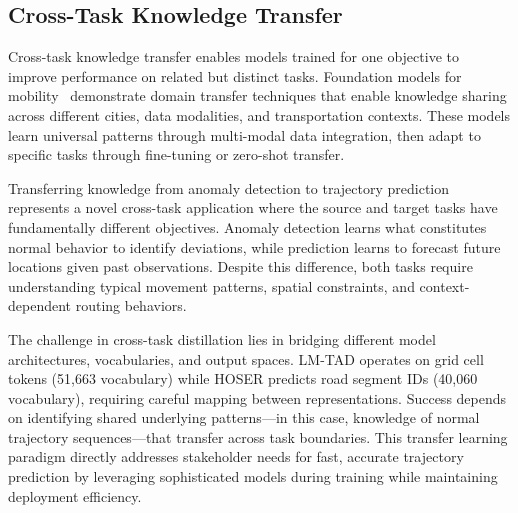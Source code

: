 \subsection{Cross-Task Knowledge Transfer}
\label{sec:lit-transfer}

Cross-task knowledge transfer enables models trained for one objective to improve performance on related but distinct tasks. Foundation models for mobility~\cite{maLearningUniversalHuman2025} demonstrate domain transfer techniques that enable knowledge sharing across different cities, data modalities, and transportation contexts. These models learn universal patterns through multi-modal data integration, then adapt to specific tasks through fine-tuning or zero-shot transfer.

Transferring knowledge from anomaly detection to trajectory prediction represents a novel cross-task application where the source and target tasks have fundamentally different objectives. Anomaly detection learns what constitutes normal behavior to identify deviations, while prediction learns to forecast future locations given past observations. Despite this difference, both tasks require understanding typical movement patterns, spatial constraints, and context-dependent routing behaviors.

The challenge in cross-task distillation lies in bridging different model architectures, vocabularies, and output spaces. LM-TAD operates on grid cell tokens (51,663 vocabulary) while HOSER predicts road segment IDs (40,060 vocabulary), requiring careful mapping between representations. Success depends on identifying shared underlying patterns—in this case, knowledge of normal trajectory sequences—that transfer across task boundaries. This transfer learning paradigm directly addresses stakeholder needs for fast, accurate trajectory prediction by leveraging sophisticated models during training while maintaining deployment efficiency.
